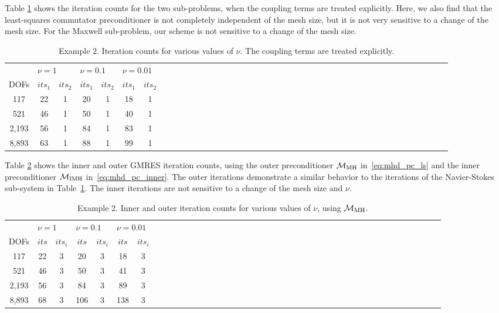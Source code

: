 \documentclass{siamltex}
\begin{document}
Table \ref{tab:singular_iterations_pe} shows the iteration counts for the two sub-problems, when the coupling terms are treated explicitly. Here, we also find that the least-squares commutator preconditioner is not completely independent of the mesh size, but it is not very sensitive to a change of the mesh size. For the Maxwell sub-problem, our scheme is not sensitive to a change of the mesh size.

\begin{table}[!ht]
\begin{center}
\begin{tabular}{cccccccccccccccccccccccccccccccccccccccccc}
\hline
& \multicolumn{2}{l}{$\nu=1$} & \multicolumn{2}{l}{$\nu=0.1$} & \multicolumn{2}{l}{$\nu=0.01$} \\
DOFs & $its_1$ & $its_2$ & $its_1$ & $its_2$ & $its_1$ & $its_2$\\
\hline
117 & 22 & 1 & 20 & 1 & 18 & 1\\
521 & 46 & 1 & 50 & 1 & 40 & 1 \\
2,193 & 56 & 1 & 84 & 1 & 83 & 1\\
8,893 & 63 & 1 & 88 & 1 & 99 & 1\\
\hline
\end{tabular}
\caption{Example 2. Iteration counts for various values of $\nu$. The coupling terms are treated explicitly.}
\label{tab:singular_iterations_pe}
\end{center}
\end{table}

Table \ref{tab:singular_iterations_pc} shows the inner and outer GMRES iteration counts, using the outer preconditioner $\mathcal{M}_{\rm MH}$ in~\eqref{eq:mhd_pc_ls} and the inner preconditioner $\mathcal{M}_{\rm IMH}$ in~\eqref{eq:mhd_pc_inner}. The outer iterations demonstrate a similar behavior to the iterations of the Navier-Stokes sub-system in Table~\ref{tab:singular_iterations_pe}. The inner iterations are not sensitive to a change of the mesh size and $\nu$.

\begin{table}[!ht]
\begin{center}
\begin{tabular}{cccccccccccccccccccccccccccccccccccccccccc}
\hline
& \multicolumn{2}{l}{$\nu=1$} & \multicolumn{2}{l}{$\nu=0.1$} & \multicolumn{2}{l}{$\nu=0.01$} \\
DOFs & $its$ & $its_i$ & $its$ & $its_i$ & $its$ & $its_i$\\
\hline
117 & 22 & 3 & 20 & 3 & 18 & 3\\
521 & 46 & 3 & 50 & 3 & 41 & 3 \\
2,193 & 56 & 3 & 84 & 3 & 89 & 3\\
8,893 & 68 & 3 & 106 & 3 & 138 & 3\\
\hline
\end{tabular}
\caption{Example 2. Inner and outer iteration counts for various values of $\nu$, using $\mathcal{M}_{\rm MH}$.}
\label{tab:singular_iterations_pc}
\end{center}
\end{table}
\end{document}

